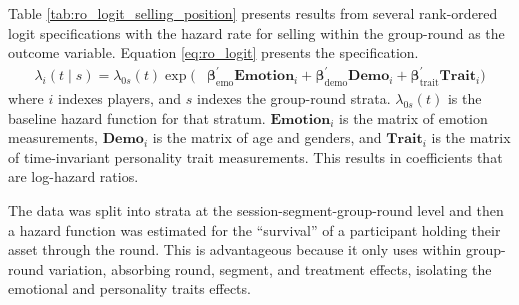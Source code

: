 \documentclass[11pt]{article}
\begin{document}
Table \ref{tab:ro_logit_selling_position} presents results from several rank-ordered logit specifications with the hazard rate for selling within the group-round as the outcome variable. Equation \ref{eq:ro_logit} presents the specification.
  \begin{equation}                                                                                                                                                                    
  \begin{split}                                                                                                                                                                       
      \lambda_i(t \mid s) = \lambda_{0s}(t) \exp\bigl(                                                                                                                                
      & \boldsymbol{\beta}_{\text{emo}}^{\prime} \mathbf{Emotion}_i + \boldsymbol{\beta}_{\text{demo}}^{\prime} \mathbf{Demo}_i  + \boldsymbol{\beta}_{\text{trait}}^{\prime} \mathbf{Trait}_i \bigr)
  \end{split}
  \label{eq:ro_logit}
  \end{equation}
where $i$ indexes players, and $s$ indexes the group-round strata. $\lambda_{0s}(t)$ is the baseline hazard function for that stratum. $\mathbf{Emotion}_i$ is the matrix of emotion measurements, $\mathbf{Demo}_i$ is the matrix of age and genders, and $\mathbf{Trait}_i$ is the matrix of time-invariant personality trait measurements. This results in coefficients that are log-hazard ratios.

The data was split into strata at the session-segment-group-round level and then a hazard function was estimated for the ``survival'' of a participant holding their asset through the round. This is advantageous because it only uses within group-round variation, absorbing round, segment, and treatment effects, isolating the emotional and personality traits effects. 
\end{document}
